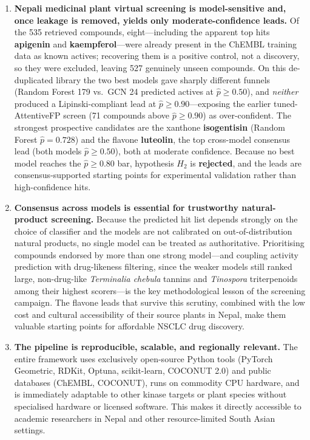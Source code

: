 \begin{enumerate}
    \item \textbf{Nepali medicinal plant virtual screening is model-sensitive and,
          once leakage is removed, yields only moderate-confidence leads.} Of the 535
          retrieved compounds, eight---including the apparent top hits \textbf{apigenin}
          and \textbf{kaempferol}---were already present in the ChEMBL training data as
          known actives; recovering them is a positive control, not a discovery, so they
          were excluded, leaving 527 genuinely unseen compounds. On this de-duplicated
          library the two best models gave sharply different funnels (Random Forest 179
          vs.\ GCN 24 predicted actives at $\hat{p} \geq 0.50$), and \emph{neither}
          produced a Lipinski-compliant lead at $\hat{p} \geq 0.90$---exposing the
          earlier tuned-AttentiveFP screen (71 compounds above $\hat{p} \geq 0.90$) as
          over-confident. The strongest prospective candidates are the xanthone
          \textbf{isogentisin} (Random Forest $\hat{p} = 0.728$) and the flavone
          \textbf{luteolin}, the top cross-model consensus lead (both models
          $\hat{p} \geq 0.50$), both at moderate confidence. Because no best model
          reaches the $\hat{p} \geq 0.80$ bar, hypothesis $H_2$ is \textbf{rejected},
          and the leads are consensus-supported starting points for experimental
          validation rather than high-confidence hits.

    \item \textbf{Consensus across models is essential for trustworthy natural-product
          screening.} Because the predicted hit list depends strongly on the choice of
          classifier and the models are not calibrated on out-of-distribution natural
          products, no single model can be treated as authoritative. Prioritising
          compounds endorsed by more than one strong model---and coupling activity
          prediction with drug-likeness filtering, since the weaker models still
          ranked large, non-drug-like \textit{Terminalia chebula} tannins and
          \textit{Tinospora} triterpenoids among their highest scorers---is the key
          methodological lesson of the screening campaign. The flavone leads that survive this scrutiny, combined
          with the low cost and cultural accessibility of their source plants in Nepal,
          make them valuable starting points for affordable NSCLC drug discovery.

    \item \textbf{The pipeline is reproducible, scalable, and regionally relevant.}
          The entire framework uses exclusively open-source Python tools (PyTorch
          Geometric, RDKit, Optuna, scikit-learn, COCONUT 2.0) and public databases
          (ChEMBL, COCONUT), runs on commodity CPU hardware, and is immediately
          adaptable to other kinase targets or plant species without specialised
          hardware or licensed software. This makes it directly accessible to academic
          researchers in Nepal and other resource-limited South Asian settings.
\end{enumerate}


